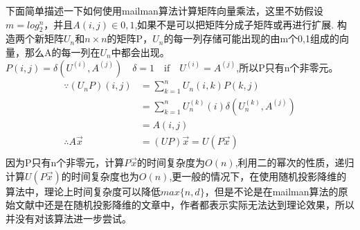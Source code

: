 \documentclass{ctexart}
\begin{document}
    下面简单描述一下如何使用mailman算法计算矩阵向量乘法，这里不妨假设$ m = log_2^n$，并且$A(i,j) \in {0,1}$,如果不是可以把矩阵分成子矩阵或再进行扩展.
    构造两个新矩阵$U_{n}$和$n \times n$的矩阵P，$U_{n}$的每一列存储可能出现的由m个{0,1}组成的向量，那么A的每一列在$U_{n}$中都会出现。$P(i,j) = \delta(U^{(i)},A^{(j)})\quad \delta = 1 \quad \text{if} \quad U^{(i)} = A^{(j)}$,所以P只有n个非零元。
    \begin{align*}
    \because (U_{n}P)(i,j) &=\sum_{k=1}^n U_{n}(i,k)P(k,j)\\
    &=\sum_{k=1}^n U_{n}^{(k)}(i)\delta (U_{n}^{(k)},A^{(j)})\\
    &=A(i,j)\\
    \therefore A\vec{x} &=(UP)\vec{x} = U(P\vec{x})\\
    \end{align*}
    因为P只有n个非零元，计算$P\vec{x}$的时间复杂度为$O(n)$,利用二的幂次的性质，递归计算$U(P\vec{x})$的时间复杂度也为$O(n)$,更一般的情况下，在使用随机投影降维的算法中，理论上时间复杂度可以降低$max\{n,d\}$，但是不论是在mailman算法的原始文献中还是在随机投影降维的文章中，作者都表示实际无法达到理论效果，所以并没有对该算法进一步尝试。

\nocite{*} %


\end{document}
